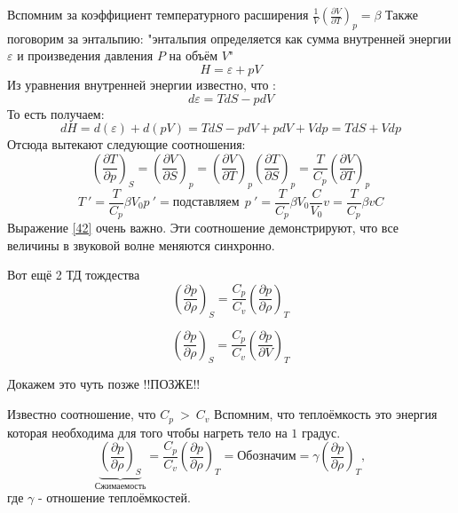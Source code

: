\documentclass[14pt,a4paper,oneside]{extarticle}	%
\newcommand{\bracket}[1] {\left( #1 \right) } %
\newcommand{\dd}[1] {\partial #1 }
\begin{document}
Вспомним за коэффициент температурного расширения $ \frac{1}{V}\bracket{\frac{\partial V}{\partial T}}_{p} = \beta  $ 
Также поговорим за энтальпию:
"энтальпия определяется как сумма внутренней энергии $ \varepsilon $ и произведения давления $ P $ на объём $ V $"
 \begin{equation}\label{38}
H = \varepsilon + pV
\end{equation}
Из уравнения внутренней энергии известно, что :
\begin{equation}\label{39}
d\varepsilon = TdS - pdV
\end{equation}
То есть получаем:
\begin{equation}\label{40}
dH = d(\varepsilon) + d(pV) = TdS - pdV + pdV +Vdp = TdS + Vdp
\end{equation}
Отсюда вытекают следующие соотношения:
\begin{equation}\label{41}
 \bracket{\frac{\partial T}{\partial p}}_{S} = \bracket{\frac{\partial V}{\partial S}}_{p} = \bracket{\frac{\partial V}{\partial T}}_{p}\bracket{\frac{\partial T}{\partial S}}_{p} = \frac{T}{C_{p}}\bracket{\frac{\partial V}{\partial T}}_{p}
\end{equation}
\begin{equation}\label{42}
T\:' = \frac{T}{C_{p}}\beta V_{0}p\:' = \text{подставляем}\:\: p\:'=  \frac{T}{C_{p}}\beta V_{0}\frac{C}{V_{0}}v = \frac{T}{C_{p}}\beta v C 
\end{equation}
Выражение \ref{42} очень важно. 
Эти соотношение демонстрируют, что все величины в звуковой волне меняются синхронно.

Вот ещё 2 ТД тождества 
\begin{equation}\label{43}
\bracket{\frac{\partial p}{\partial \rho}}_{S} = \frac{C_{p}}{C_{v}}\bracket{\frac{\dd{p}}{\dd{\rho}}}_{T}
\end{equation}

\begin{equation}\label{43.1}
\bracket{\frac{\partial p}{\partial \rho}}_{S} = \frac{C_{p}}{C_{v}}\bracket{\frac{\dd{p}}{\dd{V}}}_{T}
\end{equation}

Докажем это чуть позже !!ПОЗЖЕ!!


Известно соотношение, что $ C_{p}\: > \: C_{v} $
Вспомним, что теплоёмкость это энергия которая необходима для того чтобы нагреть тело на $ 1 $ градус. 
\begin{equation}\label{44}
\underbrace{\bracket{\frac{\partial p}{\partial \rho}}_{S}}_{\text{Сжимаемость}} = \frac{C_{p}}{C_{v}}\bracket{\frac{\dd{p}}{\dd{\rho}}}_{T} = \text{Обозначим} = \gamma\bracket{\frac{\dd{p}}{\dd{\rho}}}_{T},
\end{equation}
где $ \gamma $ - отношение теплоёмкостей.
\end{document}
